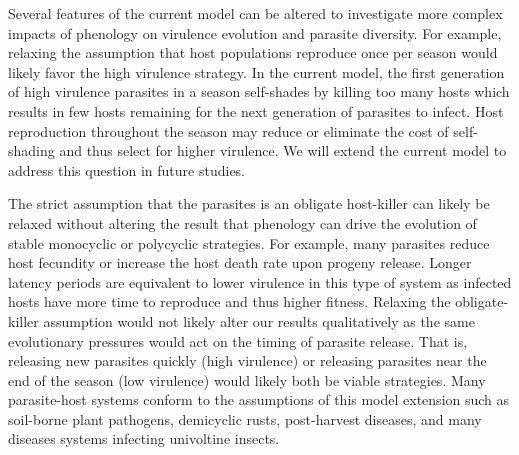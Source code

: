 \documentclass{article}
\begin{document}
Several features of the current model can be altered to investigate more complex impacts of phenology on virulence evolution and parasite diversity. For example, relaxing the assumption that host populations reproduce once per season would likely favor the high virulence strategy. In the current model, the first generation of high virulence parasites in a season self-shades by killing too many hosts which results in few hosts remaining for the next generation of parasites to infect. Host reproduction throughout the season may reduce or eliminate the cost of self-shading and thus select for higher virulence. %
We will extend the current model to address this question in future studies.

The strict assumption that the parasites is an obligate host-killer can likely be relaxed without altering the result that phenology can drive the evolution of stable monocyclic or polycyclic strategies. For example, many parasites reduce host fecundity or increase the host death rate upon progeny release. Longer latency periods are equivalent to lower virulence in this type of system as infected hosts have more time to reproduce and thus higher fitness. Relaxing the obligate-killer assumption would not likely alter our results qualitatively as the same evolutionary pressures would act on the timing of parasite release. That is, releasing new parasites quickly (high virulence) or releasing parasites near the end of the season (low virulence) would likely both be viable strategies. Many parasite-host systems conform to the assumptions of this model extension such as soil-borne plant pathogens, demicyclic rusts, post-harvest diseases, and many diseases systems infecting univoltine insects\cite{gaulin2007root,zehr1982control,crowell1934hosts,holuvsa2017pathogen}.




\end{document}
